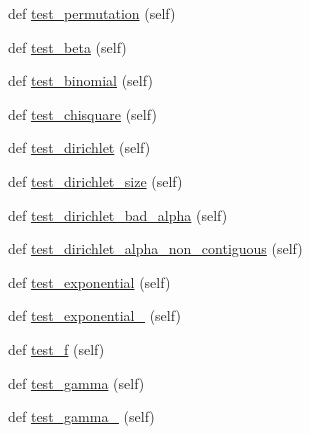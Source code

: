 \begin{DoxyCompactItemize}
\item 
def \hyperlink{classnumpy_1_1random_1_1tests_1_1test__randomstate_1_1TestRandomDist_a595652ebad2f7415d83136bc07abfd55}{test\+\_\+permutation} (self)
\item 
def \hyperlink{classnumpy_1_1random_1_1tests_1_1test__randomstate_1_1TestRandomDist_ae2fd8eb306b50e66e738f838953faf47}{test\+\_\+beta} (self)
\item 
def \hyperlink{classnumpy_1_1random_1_1tests_1_1test__randomstate_1_1TestRandomDist_ab561c83f245bd845af50c4a052697879}{test\+\_\+binomial} (self)
\item 
def \hyperlink{classnumpy_1_1random_1_1tests_1_1test__randomstate_1_1TestRandomDist_a003aeb26e26be293c337d9ff451cb4e1}{test\+\_\+chisquare} (self)
\item 
def \hyperlink{classnumpy_1_1random_1_1tests_1_1test__randomstate_1_1TestRandomDist_ad7639aa07ee6042ae053c731858bc2b9}{test\+\_\+dirichlet} (self)
\item 
def \hyperlink{classnumpy_1_1random_1_1tests_1_1test__randomstate_1_1TestRandomDist_a968770a46a490b8325620687d37690ee}{test\+\_\+dirichlet\+\_\+size} (self)
\item 
def \hyperlink{classnumpy_1_1random_1_1tests_1_1test__randomstate_1_1TestRandomDist_a404a42e2d2a5683ca3d1d3b9b5973d0d}{test\+\_\+dirichlet\+\_\+bad\+\_\+alpha} (self)
\item 
def \hyperlink{classnumpy_1_1random_1_1tests_1_1test__randomstate_1_1TestRandomDist_a4720df51165c881615fa56ae015b78eb}{test\+\_\+dirichlet\+\_\+alpha\+\_\+non\+\_\+contiguous} (self)
\item 
def \hyperlink{classnumpy_1_1random_1_1tests_1_1test__randomstate_1_1TestRandomDist_a46c8f14d3b660852dfe5602b55bfabda}{test\+\_\+exponential} (self)
\item 
def \hyperlink{classnumpy_1_1random_1_1tests_1_1test__randomstate_1_1TestRandomDist_ab3a753714b7ee47f963a31eff0634db0}{test\+\_\+exponential\+\_} (self)
\item 
def \hyperlink{classnumpy_1_1random_1_1tests_1_1test__randomstate_1_1TestRandomDist_a18dc24c97681b01b001c34dabcba62f9}{test\+\_\+f} (self)
\item 
def \hyperlink{classnumpy_1_1random_1_1tests_1_1test__randomstate_1_1TestRandomDist_a33073a98df75bd5544ec0f478a619bf0}{test\+\_\+gamma} (self)
\item 
def \hyperlink{classnumpy_1_1random_1_1tests_1_1test__randomstate_1_1TestRandomDist_a6f2ab4380e3872bdcb657fd8b9462023}{test\+\_\+gamma\+\_} (self)
\item 

\end{DoxyCompactItemize}
